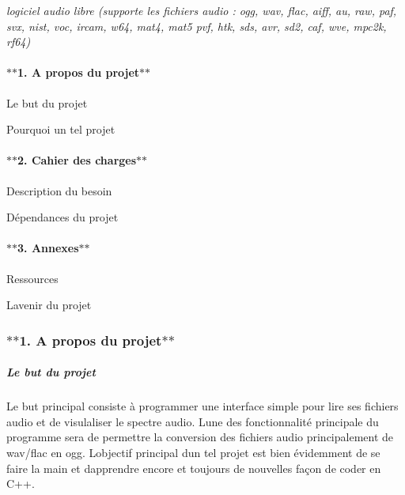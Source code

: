 {\itshape logiciel audio libre (supporte les fichiers audio \+: ogg, wav, flac, aiff, au, raw, paf, svx, nist, voc, ircam, w64, mat4, mat5 pvf, htk, sds, avr, sd2, caf, wve, mpc2k, rf64)}

\paragraph*{$\ast$$\ast$1. A propos du projet$\ast$$\ast$}


\begin{DoxyItemize}
\item Le but du projet
\item Pourquoi un tel projet
\end{DoxyItemize}

\paragraph*{$\ast$$\ast$2. Cahier des charges$\ast$$\ast$}


\begin{DoxyItemize}
\item Description du besoin
\item Dépendances du projet
\end{DoxyItemize}

\paragraph*{$\ast$$\ast$3. Annexes$\ast$$\ast$}


\begin{DoxyItemize}
\item Ressources
\item L\textquotesingle{}avenir du projet 


\end{DoxyItemize}

\subsubsection*{$\ast$$\ast$1. A propos du projet$\ast$$\ast$}

\subparagraph*{Le but du projet}

Le but principal consiste à programmer une interface simple pour lire ses fichiers audio et de visulaliser le spectre audio. L\textquotesingle{}une des fonctionnalité principale du programme sera de permettre la conversion des fichiers audio principalement de wav/flac en ogg. L\textquotesingle{}objectif principal d\textquotesingle{}un tel projet est bien évidemment de se faire la main et d\textquotesingle{}apprendre encore et toujours de nouvelles façon de coder en C++.

